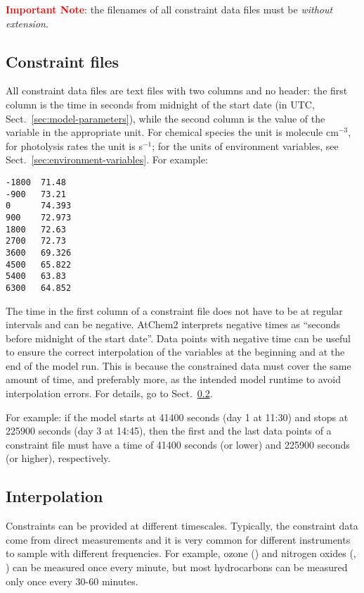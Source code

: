 \textcolor{red}{\bf Important Note}: the filenames of all constraint
data files must be \emph{without extension}.

\subsection{Constraint files} \label{subsec:constraint-files}

All constraint data files are text files with two columns and no
header: the first column is the time in seconds from midnight of the
start date (in UTC, Sect.~\ref{sec:model-parameters}), while the
second column is the value of the variable in the appropriate unit.
For chemical species the unit is molecule cm$^{-3}$, for photolysis
rates the unit is s$^{-1}$; for the units of environment variables,
see Sect.~\ref{sec:environment-variables}. For example:

\begin{verbatim}
-1800  71.48
-900   73.21
0      74.393
900    72.973
1800   72.63
2700   72.73
3600   69.326
4500   65.822
5400   63.83
6300   64.852
\end{verbatim}

The time in the first column of a constraint file does not have to be
at regular intervals and can be negative. AtChem2 interprets negative
times as ``seconds before midnight of the start date''. Data points
with negative time can be useful to ensure the correct interpolation of
the variables at the beginning and at the end of the model run. This
is because the constrained data must cover the same amount of time, and
preferably more, as the intended model runtime to avoid interpolation
errors. For details, go to Sect.~\ref{subsec:interpolation}.

For example: if the model starts at 41400 seconds (day 1 at 11:30) and
stops at 225900 seconds (day 3 at 14:45), then the first and the last
data points of a constraint file must have a time of 41400 seconds (or
lower) and 225900 seconds (or higher), respectively.

\subsection{Interpolation} \label{subsec:interpolation}

Constraints can be provided at different timescales. Typically, the
constraint data come from direct measurements and it is very common
for different instruments to sample with different frequencies. For
example, ozone () and nitrogen oxides (, ) can
be measured once every minute, but most hydrocarbons can be measured
only once every 30-60 minutes.

